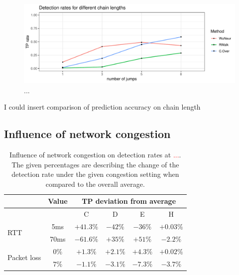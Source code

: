 \documentclass[runningheads]{llncs}\usepackage[]{graphicx}\usepackage[]{color}
\makeatletter
\def\maxwidth{ %
  \ifdim\Gin@nat@width>\linewidth
    \linewidth
  \else
    \Gin@nat@width
  \fi
}
\newenvironment{knitrout}{}{} %
\makeatother
\begin{document}
\begin{knitrout}
\color{fgcolor}\begin{figure}
\includegraphics[width=\maxwidth]{figure/Influencechainl-1} \caption[..]{...}\label{fig:Influencechainl}
\end{figure}


\end{knitrout}


I could insert comparison of prediction accuracy on chain length


\subsection{Influence of network congestion}


\begin{table}
\centering
\begin{tabular}{l|c|c|c|c|c}
& Value & \multicolumn{4}{c}{TP deviation from average}\\ \hline
 &  & C & D& E & H \\ \hline
\multirow{2}{*}{RTT} & 5ms& $+41.3\%$& $-42\%$ & $-36\%$ & $+0.03\%$ \\ \cline{2-6}
 & 70ms  & $-61.6\%$ & $+35\%$ & $+51\%$& $-2.2\%$\\ \hline

\multirow{2}{*}{Packet loss} & $0\%$ & $+1.3\%$ & $+2.1\%$ & $+4.3\%$ & $+0.02\%$\\ \cline{2-6}
 & $7\%$  & $-1.1\%$ & $-3.1\%$ & $-7.3\%$ & $-3.7\%$\\ \hline

\end{tabular}
\caption{Influence of network congestion on detection rates at \textcolor{red}{...}. The given percentages are describing the change of the detection rate under the given congestion setting when compared to the overall average.}\label{Tab:Congestion}
\end{table}




%



\appendix




 
\end{document}
